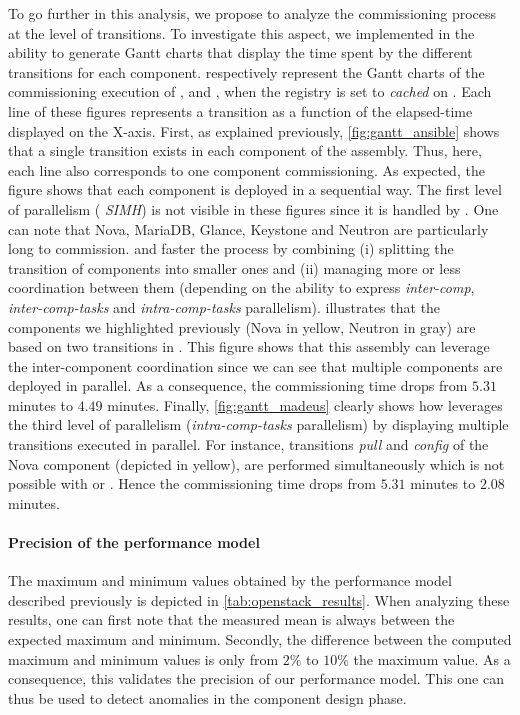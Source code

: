 To go further in this analysis, we propose to analyze the commissioning process
at the level of transitions. To investigate this aspect, we implemented in \mad
the ability to generate Gantt charts that display the time spent by the
different transitions for each component.
respectively represent the Gantt charts of the commissioning execution
of \ansass, \aeoass and \madass, when the registry is set to
\emph{cached} on \ecotype. Each line of these figures represents a
transition as a function of the elapsed-time displayed on the X-axis.
First, as explained previously, \cref{fig:gantt_ansible} shows that a
single transition exists in each component of the \ansass
assembly. Thus, here, each line also corresponds to one component
commissioning. As expected, the figure shows that each component is
deployed in a sequential way. The first level of parallelism (\ie
\emph{SIMH}) is not visible in these figures since it is handled by
\ansible. One can note that Nova, MariaDB, Glance, Keystone and
Neutron are particularly long to commission. \aeoass and \madass
faster the process by combining (i) splitting the transition of
components into smaller ones and (ii) managing more or less
coordination between them (depending on the ability to express
\emph{inter-comp}, \emph{inter-comp-tasks} and \emph{intra-comp-tasks}
parallelism).
%
 illustrates that the components we highlighted
previously (\eg Nova in yellow, Neutron in gray) are based on two transitions in
\aeoass. This figure shows that this assembly can leverage the
inter-component coordination since we can see that multiple components are
deployed in parallel. As a consequence, the commissioning time drops from $5.31$
minutes to $4.49$ minutes.
%
Finally, \cref{fig:gantt_madeus} clearly shows how \mad leverages the third
level of parallelism (\ie \emph{intra-comp-tasks} parallelism) by displaying multiple
transitions executed in parallel. For instance, transitions \emph{pull} and
\emph{config} of the Nova component (depicted in yellow), are performed
simultaneously which is not possible with \ansible or \aeolus. Hence the
commissioning time drops from $5.31$ minutes to $2.08$ minutes.
%

\paragraph{Precision of the performance model}
The maximum and minimum values obtained by the performance model described
previously is depicted in \cref{tab:openstack_results}. When analyzing these
results, one can first note that the measured mean is always between the
expected maximum and minimum. Secondly, the difference between the computed
maximum and minimum values is only from $2\%$ to $10\%$ the maximum value. As a
consequence, this validates the precision of our performance model.
This one can thus be used to detect anomalies in the component design
phase.

